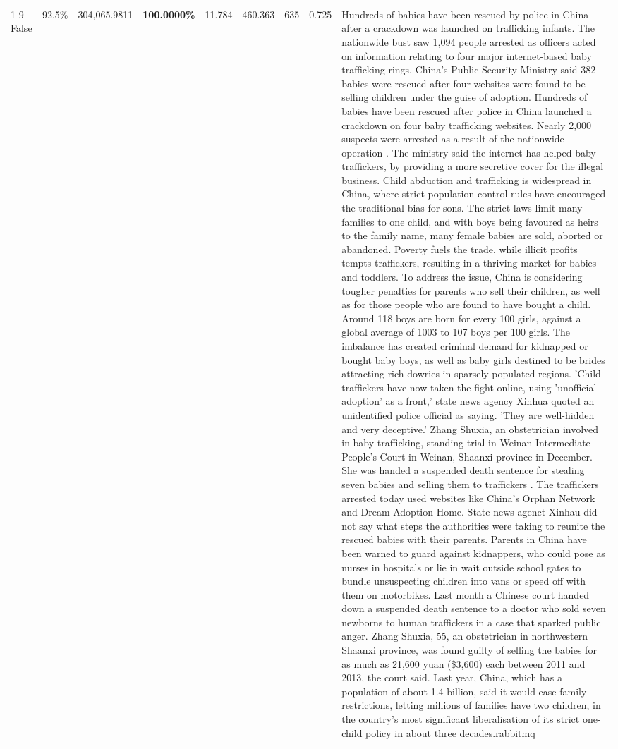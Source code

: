 \begin{table}[H]
\begin{tabular}{lllrlllll}
\cline{1-9}
False & 92.5\% & 304,065.9811 & \bfseries \color{red} 100.0000\% & 11.784 & 460.363 & 635 & 0.725 & Hundreds of babies have been rescued by police in China after a crackdown was launched on trafficking infants. The nationwide bust saw 1,094 people arrested as officers acted on information relating to four major internet-based baby trafficking rings. China's Public Security Ministry said 382 babies were rescued after four websites were found to be selling children under the guise of adoption. Hundreds of babies have been rescued after police in China launched a crackdown on four baby trafficking websites. Nearly 2,000 suspects were arrested as a result of the nationwide operation . The ministry said the internet has helped baby traffickers, by providing a more secretive cover for the illegal business. Child abduction and trafficking is widespread in China, where strict population control rules have encouraged the traditional bias for sons. The strict laws limit many families to one child, and with boys being favoured as heirs to the family name, many female babies are sold, aborted or abandoned. Poverty fuels the trade, while illicit profits tempts traffickers, resulting in a thriving market for babies and toddlers. To address the issue, China is considering tougher penalties for parents who sell their children, as well as for those people who are found to have bought a child. Around 118 boys are born for every 100 girls, against a global average of 1003 to 107 boys per 100 girls. The imbalance has created criminal demand for kidnapped or bought baby boys, as well as baby girls destined to be brides attracting rich dowries in sparsely populated regions. 'Child traffickers have now taken the fight online, using 'unofficial adoption' as a front,' state news agency Xinhua quoted an unidentified police official as saying. 'They are well-hidden and very deceptive.' Zhang Shuxia, an obstetrician involved in baby trafficking, standing trial in Weinan Intermediate People's Court in Weinan, Shaanxi province in December. She was handed a suspended death sentence for stealing seven babies and selling them to traffickers . The traffickers arrested today used websites like China's Orphan Network and Dream Adoption Home. State news agenct Xinhau did not say what steps the authorities were taking to reunite the rescued babies with their parents. Parents in China have been warned to guard against kidnappers, who could pose as nurses in hospitals or lie in wait outside school gates to bundle unsuspecting children into vans or speed off with them on motorbikes. Last month a Chinese court handed down a suspended death sentence to a doctor who sold seven newborns to human traffickers in a case that sparked public anger. Zhang Shuxia, 55, an obstetrician in northwestern Shaanxi province, was found guilty of selling the babies for as much as 21,600 yuan (\$3,600) each between 2011 and 2013, the court said. Last year, China, which has a population of about 1.4 billion, said it would ease family restrictions, letting millions of families have two children, in the country's most significant liberalisation of its strict one-child policy in about three decades.rabbitmq \\

\end{tabular}
\end{table}

